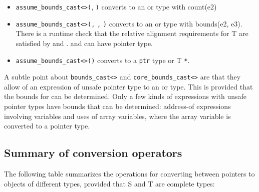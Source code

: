 \begin{itemize}
\item
  \texttt{assume\_bounds\_cast\textless{}}\texttt{\textgreater{}(},
  \texttt{)} converts  to an \arrayptr or
  \arrayview type with count(e2)
\item
  \texttt{assume\_bounds\_cast\textless{}}\texttt{\textgreater{}(}\texttt{,}
  \texttt{,} \texttt{)} converts  to an
  \arrayptr or \arrayview type with bounds(e2, e3).
  There is a runtime check that the relative alignment requirements for
  T are satisfied by   and .  and
   can have pointer type.
\item
  \texttt{assume\_bounds\_cast\textless{}}\texttt{\textgreater{}(}\texttt{)}
  converts  to a \texttt{ptr} type or T \texttt{*}.
\end{itemize}

A subtle point about
\texttt{bounds\_cast\textless{}}\texttt{\textgreater{}} and
\texttt{core\_bounds\_cast\textless{}}\texttt{\textgreater{}}
are that they allow  of an expression
 of unsafe pointer type to an \arrayview or
\arrayptr type. This is provided that the bounds for 
can be determined. Only a few kinds of expressions with unsafe pointer
types have bounds that can be determined: address-of expressions
involving variables and uses of array variables, where the array
variable is converted to a pointer type.

\subsection{Summary of conversion operators}

The following table summarizes the operations for converting between
pointers to objects of different types, provided that S and T are
complete types:

